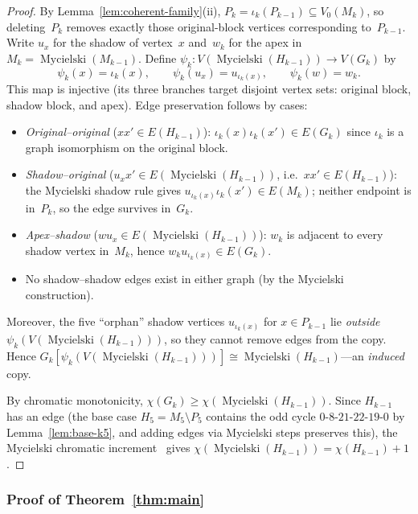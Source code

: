 \documentclass[11pt,a4paper]{amsart}
\theoremstyle{plain}
\theoremstyle{definition}
\theoremstyle{remark}
\newcommand{\myc}{\operatorname{Mycielski}}
\newcommand{\chr}{\chi}
\begin{document}
\begin{proof}
By Lemma~\ref{lem:coherent-family}(ii),
$P_k = \iota_k(P_{k-1}) \subseteq V_0(M_k)$, so deleting~$P_k$ removes
exactly those original-block vertices corresponding to~$P_{k-1}$.  Write
$u_x$ for the shadow of vertex~$x$ and~$w_k$ for the apex in $M_k = \myc(M_{k-1})$.
Define $\psi_k \colon V(\myc(H_{k-1})) \to V(G_k)$ by
\[
  \psi_k(x) = \iota_k(x),
  \qquad
  \psi_k(u_x) = u_{\iota_k(x)},
  \qquad
  \psi_k(w) = w_k.
\]
This map is injective (its three branches target disjoint vertex sets:
original block, shadow block, and apex).
Edge preservation follows by cases:
\begin{itemize}
\item \emph{Original--original} ($xx' \in E(H_{k-1})$):
  $\iota_k(x)\iota_k(x') \in E(G_k)$ since $\iota_k$ is a graph isomorphism
  on the original block.
\item \emph{Shadow--original} ($u_x x' \in E(\myc(H_{k-1}))$, i.e.\
  $xx' \in E(H_{k-1})$): the Mycielski shadow rule gives
  $u_{\iota_k(x)}\iota_k(x') \in E(M_k)$; neither endpoint is in~$P_k$,
  so the edge survives in~$G_k$.
\item \emph{Apex--shadow} ($w u_x \in E(\myc(H_{k-1}))$):
  $w_k$ is adjacent to every shadow vertex in~$M_k$, hence
  $w_k u_{\iota_k(x)} \in E(G_k)$.
\item No shadow--shadow edges exist in either graph (by the Mycielski
  construction).
\end{itemize}
Moreover, the five ``orphan'' shadow vertices $u_{\iota_k(x)}$ for
$x \in P_{k-1}$ lie \emph{outside} $\psi_k(V(\myc(H_{k-1})))$, so they
cannot remove edges from the copy.  Hence $G_k[\psi_k(V(\myc(H_{k-1})))]
\cong \myc(H_{k-1})$---an \emph{induced} copy.

By chromatic monotonicity, $\chr(G_k) \geq \chr(\myc(H_{k-1}))$.  Since
$H_{k-1}$ has an edge (the base case $H_5 = M_5 \setminus P_5$ contains the
odd cycle $0$-$8$-$21$-$22$-$19$-$0$ by Lemma~\ref{lem:base-k5}, and adding
edges via Mycielski steps preserves this), the Mycielski chromatic
increment~\cite{mycielski1955} gives
$\chr(\myc(H_{k-1})) = \chr(H_{k-1}) + 1$.
\end{proof}

\subsubsection*{Proof of Theorem~\ref{thm:main}}
\end{document}
